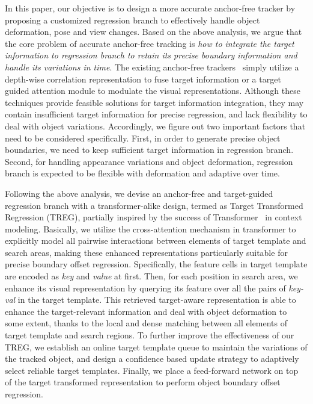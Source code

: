 \documentclass[10pt,twocolumn,letterpaper]{article}
\begin{document}
In this paper, our objective is to design a more accurate anchor-free tracker by proposing a customized regression branch to effectively handle object deformation, pose and view changes. Based on the above analysis, we argue that the core problem of accurate anchor-free tracking is {\em how to integrate the target information to regression branch to retain its precise boundary information and handle its variations in time}. The existing anchor-free trackers~\cite{ocean,siamfc++,siamban,siamcar} simply utilize a depth-wise correlation representation to fuse target information or a target guided attention module to modulate the visual representations. Although these techniques provide feasible solutions for target information integration, they may contain insufficient target information for precise regression, and lack flexibility to deal with object variations. Accordingly, we figure out two important factors that need to be considered specifically. First, in order to generate precise object boundaries, we need to keep sufficient target information in regression branch. Second, for handling appearance variations and object deformation, regression branch is expected to be flexible with deformation and adaptive over time.



Following the above analysis, we devise an anchor-free and target-guided regression branch with a transformer-alike design, termed as Target Transformed Regression (TREG), partially inspired by the success of Transformer~\cite{transformer} in context modeling. Basically, we utilize the cross-attention mechanism in transformer to explicitly model all pairwise interactions between elements of target template and search areas, making these enhanced representations particularly suitable for precise boundary offset regression. Specifically, the feature cells in target template are encoded as \textit{key} and \textit{value} at first. Then, for each position in search area, we enhance its visual representation by querying its feature over all the pairs of \textit{key-val} in the target template. This retrieved target-aware representation is able to enhance the target-relevant information and deal with object deformation to some extent, thanks to the local and dense matching between all elements of target template and search regions. To further improve the effectiveness of our TREG, we establish an online target template queue to maintain the variations of the tracked object, and design a confidence based update strategy to adaptively select reliable target templates. Finally, we place a feed-forward network on top of the target transformed representation to perform object boundary offset regression. 
\end{document}
